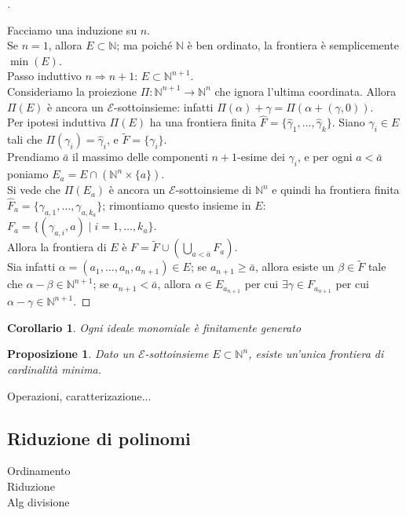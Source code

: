 \documentclass[a4paper,10pt]{article}
\theoremstyle{plain}
\newtheorem{prop}[thm]{Proposizione}
\newtheorem*{cor}{Corollario}
\theoremstyle{definition}
\newenvironment{myproof}[1][\proofname]{%
  \begin{proof}[#1]$ $\par\nobreak\ignorespaces
}{%
  \qedhere
  \end{proof}
}
\newcommand{\N}{\mathbb{N}}
\begin{document}
\begin{myproof}
    Facciamo una induzione su $n$.\\
    Se $n=1$, allora $E\subset\N$; ma poiché $\N$ è ben ordinato, la frontiera è semplicemente $\min(E)$.\\
    Passo induttivo $n\Rightarrow n+1$: $E\subset\N^{n+1}$.\\
    Consideriamo la proiezione $\Pi:\N^{n+1}\to\N^n$ che ignora l'ultima coordinata. Allora $\Pi(E)$ è ancora un $\mathcal E$-sottoinsieme: infatti $\Pi(\alpha)+\gamma=\Pi(\alpha+(\gamma,0))$.\\
    Per ipotesi induttiva $\Pi(E)$ ha una frontiera finita $\hat F=\{ \hat\gamma_1,\dots,\hat\gamma_k \}$. Siano $\gamma_i\in E$ tali che $\Pi(\gamma_i)=\hat\gamma_i$, e $\tilde F=\{ \gamma_i \}$.\\
    Prendiamo $\bar a$ il massimo delle componenti $n+1$-esime dei $\gamma_i$, e per ogni $a<\bar a$ poniamo $E_a=E\cap\left( \N^n\times\{a\} \right)$.\\
    Si vede che $\Pi(E_a)$ è ancora un $\mathcal E$-sottoinsieme di $\N^n$ e quindi ha frontiera finita $\hat F_a=\{ \gamma_{a,1},\dots,\gamma_{a,k_a} \}$; rimontiamo questo insieme in $E$: $F_a=\{ (\gamma_{a,i},a) \mid i=1,\dots,k_a \}$.\\
    Allora la frontiera di $E$ è $F=\tilde F\cup\left( \bigcup_{a<\bar a}F_a \right)$.\\
    Sia infatti $\alpha=(a_1,\dots,a_n,a_{n+1})\in E$; se $a_{n+1}\ge\bar a$, allora esiste un $\beta\in\tilde F$ tale che $\alpha-\beta\in\N^{n+1}$; se $a_{n+1}<\bar a$, allora $\alpha\in E_{a_{n+1}}$ per cui $\exists\gamma\in F_{a_{n+1}}$ per cui $\alpha-\gamma\in\N^{n+1}$.
\end{myproof}
\begin{cor}
    Ogni ideale monomiale è finitamente generato
\end{cor}

\begin{prop}
    Dato un $\mathcal E$-sottoinsieme $E\subset\N^n$, esiste un'unica frontiera di cardinalità minima.
\end{prop}

Operazioni, caratterizazione...

\subsection{Riduzione di polinomi}
Ordinamento\\
Riduzione\\
Alg divisione\\
\end{document}
